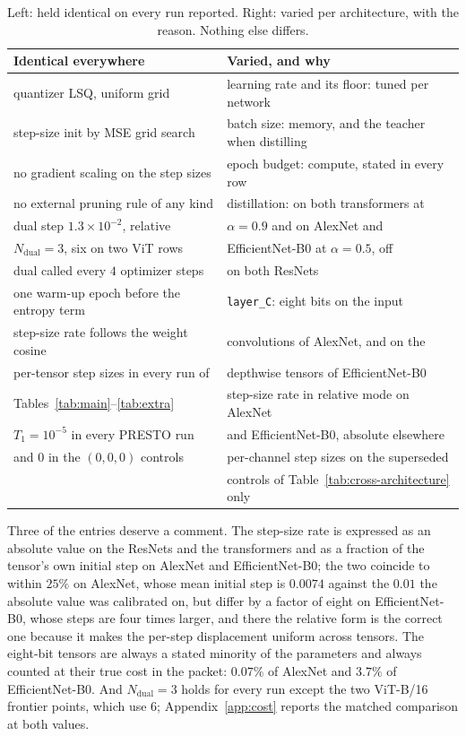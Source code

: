 \documentclass{article}
\begin{document}
\begin{table}[ht]
  \caption{Left: held identical on every run reported. Right: varied per
  architecture, with the reason. Nothing else differs.}
  \label{tab:identical}
  \centering \small
  \begin{tabular}{ll}
    \toprule
    Identical everywhere & Varied, and why \\
    \midrule
    quantizer LSQ, uniform grid & learning rate and its floor: tuned per network \\
    step-size init by MSE grid search & batch size: memory, and the teacher when distilling \\
    no gradient scaling on the step sizes & epoch budget: compute, stated in every row \\
    no external pruning rule of any kind & distillation: on both transformers at \\
    dual step $1.3\times10^{-2}$, relative & \quad $\alpha=0.9$ and on AlexNet and \\
    $N_{\mathrm{dual}}=3$, six on two ViT rows & \quad EfficientNet-B0 at $\alpha=0.5$, off \\
    dual called every $4$ optimizer steps & \quad on both ResNets \\
    one warm-up epoch before the entropy term & \texttt{layer\_C}: eight bits on the input \\
    step-size rate follows the weight cosine & \quad convolutions of AlexNet, and on the \\
    per-tensor step sizes in every run of & \quad depthwise tensors of EfficientNet-B0 \\
    \quad Tables~\ref{tab:main}--\ref{tab:extra} & step-size rate in relative mode on AlexNet \\
    $T_1=10^{-5}$ in every PRESTO run & \quad and EfficientNet-B0, absolute elsewhere \\
    \quad and $0$ in the $(0,0,0)$ controls & per-channel step sizes on the superseded \\
     & \quad controls of Table~\ref{tab:cross-architecture} only \\
    \bottomrule
  \end{tabular}
\end{table}

Three of the entries deserve a comment. The step-size rate is expressed as an absolute
value on the ResNets and the transformers and as a fraction of the tensor's own
initial step on AlexNet and EfficientNet-B0; the two coincide to within $25\%$ on
AlexNet, whose mean initial step is $0.0074$ against the $0.01$ the absolute
value was calibrated on, but differ by a factor of eight on EfficientNet-B0,
whose steps are four times larger, and there the relative form is the correct
one because it makes the per-step displacement uniform across tensors. The
eight-bit tensors are always a stated minority of the parameters and always
counted at their true cost in the packet: $0.07\%$ of AlexNet and $3.7\%$ of
EfficientNet-B0. And $N_{\mathrm{dual}}=3$ holds for every run except the two
ViT-B/16 frontier points, which use $6$; Appendix~\ref{app:cost} reports the
matched comparison at both values.
\end{document}
